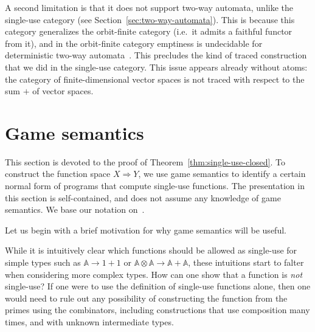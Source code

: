 \documentclass[10pt,a4paper]{amsart}
\numberwithin{equation}{section}
\theoremstyle{plain}
\newcommand{\atoms}{\mathbb A}
\begin{document}
A second limitation is that it does not support two-way automata, unlike the single-use category (see Section~\ref{sec:two-way-automata}). This is because this category generalizes the orbit-finite category (i.e.~it admits a faithful functor from it), and in the orbit-finite category emptiness is undecidable for deterministic two-way automata~\cite[Theorem 5.3]{nevenFiniteStateMachines2004}. This precludes the kind of traced construction that we did in the single-use category. This issue appears already without atoms: the category of finite-dimensional vector spaces is not traced with respect to the sum $+$ of vector spaces. 




\appendix


\newcommand{\invar}[1]{#1_{\mathrm{in}}}
\newcommand{\outvar}[1]{#1_{\mathrm{out}}}

\section{Game semantics}
\label{sec:game-semantics}

This section is devoted to the proof of Theorem~\ref{thm:single-use-closed}. To construct the function space $X \Rightarrow Y$, we use game semantics to identify a certain normal form of programs that compute single-use functions. The presentation in this section is self-contained, and does not assume any knowledge of game semantics. We base our notation on~\cite{abramsky2013semantics}.

Let us begin with a brief motivation for why game semantics will be useful.

While it is intuitively clear which functions should be allowed as single-use for simple types such as $\atoms \to 1+1$ or $\atoms \otimes \atoms \to \atoms + \atoms$, these intuitions start to falter when considering more complex types. How can one show that a function is \emph{not} single-use? If one were to use the definition of single-use functions alone, then one would need to rule out any possibility of constructing the function from the primes using the combinators, including constructions that use composition many times, and with unknown intermediate types. 
\end{document}
